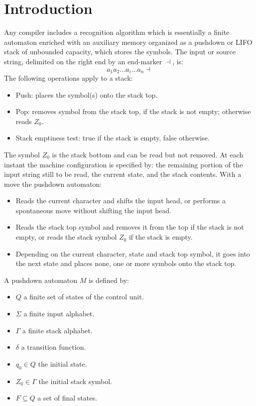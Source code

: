\section{Introduction}

Any compiler includes a recognition algorithm which is essentially a finite automaton enriched with an auxiliary memory organized as a pushdown or LIFO stack of 
unbounded capacity, which stores the symbols. The input or source string, delimited on the right end by an end-marker $\dashv$, is: 
\[a_1a_2\dots a_i\dots a_n\dashv\]
The following operations apply to a stack:
\begin{itemize}
    \item Push: places the symbol(s) onto the stack top. 
    \item Pop: removes symbol from the stack top, if the stack is not empty; otherwise reads $Z_0$. 
    \item Stack emptiness test: true if the stack is empty, false otherwise. 
\end{itemize}
The symbol $Z_0$ is the stack bottom and can be read but not removed. At each instant the machine configuration is specified by: the remaining portion of the input 
string still to be read, the current state, and the stack contents. With a move the pushdown automaton: 
\begin{itemize}
    \item Reads the current character and shifts the input head, or performs a spontaneous move without shifting the input head. 
    \item Reads the stack top symbol and removes it from the top if the stack is not empty, or reads the stack symbol $Z_0$ if the stack is empty. 
    \item Depending on the current character, state and stack top symbol, it goes into the next state and places none, one or more symbols onto the stack top. 
\end{itemize}
\begin{definition}
    A pushdown automaton $M$ is defined by:
    \begin{itemize}
        \item $Q$ a finite set of states of the control unit.
        \item $\Sigma$ a finite input alphabet.
        \item $\Gamma$ a finite stack alphabet.
        \item $\delta$ a transition function.
        \item $q_0 \in Q$ the initial state.
        \item $Z_0 \in \Gamma$ the initial stack symbol.
        \item $F \subseteq Q$ a set of final states.
    \end{itemize}
\end{definition}
